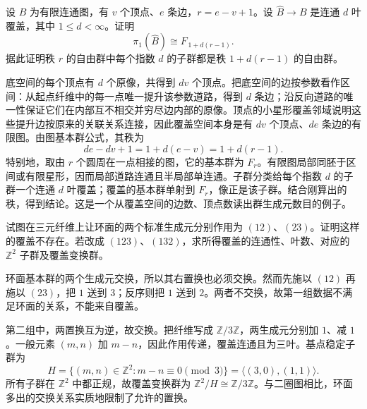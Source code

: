 \begin{exercise}\label{g1:ex:finite-index-free-rank}
	设 \(B\) 为有限连通图，有 \(v\) 个顶点、\(e\) 条边，\(r=e-v+1\)。设 \(\widehat B\rightarrow B\) 是连通 \(d\) 叶覆盖，其中 \(1\le d<\infty\)。证明
	\[
		\pi_1(\widehat B)\cong F_{\,1+d(r-1)}.
	\]
	据此证明秩 \(r\) 的自由群中每个指数 \(d\) 的子群都是秩 \(1+d(r-1)\) 的自由群。
\end{exercise}
\begin{solution}
	底空间的每个顶点有 \(d\) 个原像，共得到 \(dv\) 个顶点。把底空间的边按参数看作区间：从起点纤维中的每一点唯一提升该参数道路，得到 \(d\) 条边；沿反向道路的唯一性保证它们在内部互不相交并穷尽边内部的原像。顶点的小星形覆盖邻域说明这些提升边按原来的关联关系连接，因此覆盖空间本身是有 \(dv\) 个顶点、\(de\) 条边的有限图。由图基本群公式，其秩为
	\[
		de-dv+1=1+d(e-v)=1+d(r-1).
	\]
	特别地，取由 \(r\) 个圆周在一点相接的图，它的基本群为 \(F_r\)。有限图局部同胚于区间或有限星形，因而局部道路连通且半局部单连通。子群分类给每个指数 \(d\) 的子群一个连通 \(d\) 叶覆盖；覆盖的基本群单射到 \(F_r\)，像正是该子群。结合刚算出的秩，得到结论。这是一个从覆盖空间的边数、顶点数读出群生成元数目的例子。
\end{solution}

\begin{exercise}\label{g1:ex:torus-monodromy-relation}
	试图在三元纤维上让环面的两个标准生成元分别作用为 \((12)\)、\((23)\)。证明这样的覆盖不存在。若改成 \((123)\)、\((132)\)，求所得覆盖的连通性、叶数、对应的 \(\mathbb Z^2\) 子群及覆盖变换群。
\end{exercise}
\begin{solution}
	环面基本群的两个生成元交换，所以其右置换也必须交换。然而先施以 \((12)\) 再施以 \((23)\)，把 \(1\) 送到 \(3\)；反序则把 \(1\) 送到 \(2\)。两者不交换，故第一组数据不满足环面的关系，不能来自覆盖。

	第二组中，两置换互为逆，故交换。把纤维写成 \(\mathbb Z/3\mathbb Z\)，两生成元分别加 \(1\)、减 \(1\)。一般元素 \((m,n)\) 加 \(m-n\)，因此作用传递，覆盖连通且为三叶。基点稳定子群为
	\[
		H=\{(m,n)\in\mathbb Z^2:m-n\equiv0\pmod3\}
		=\langle(3,0),(1,1)\rangle.
	\]
	所有子群在 \(\mathbb Z^2\) 中都正规，故覆盖变换群为 \(\mathbb Z^2/H\cong\mathbb Z/3\mathbb Z\)。与二圈图相比，环面多出的交换关系实质地限制了允许的置换。
\end{solution}

